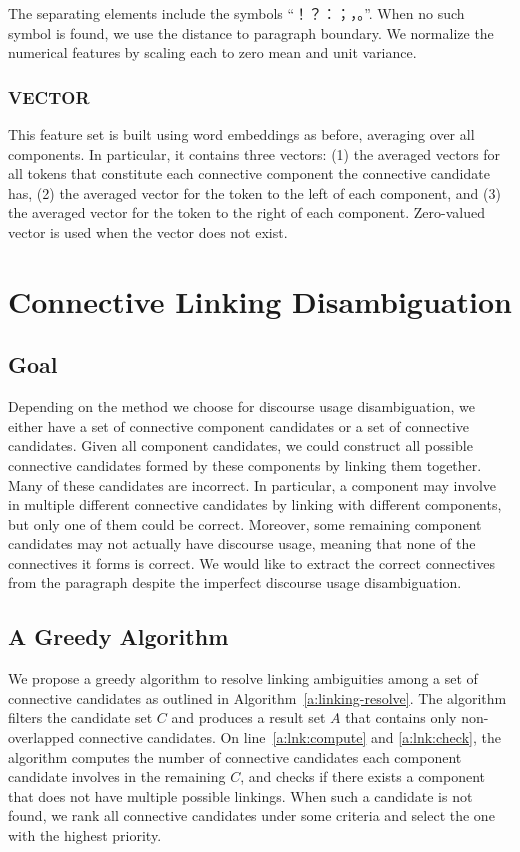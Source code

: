 The separating elements include the symbols ``！？：；，。''.
When no such symbol is found, we use the distance to paragraph boundary.
We normalize the numerical features by scaling each to zero mean and unit variance.

\subsubsection{VECTOR}

This feature set is built using word embeddings as before, averaging over all components.
In particular, it contains three vectors: (1) the averaged vectors
for all tokens that constitute each connective component the connective candidate has,
(2) the averaged vector for the
token to the left of each component, and (3) the averaged vector for the token to the
right of each component. Zero-valued vector is used when the vector does not exist.

\section{Connective Linking Disambiguation}
\label{s:linking-disambig}

\subsection{Goal}

Depending on the method we choose for discourse usage disambiguation, we
either have a set of connective component candidates or a set of connective
candidates. Given all component candidates, we could construct all possible
connective candidates formed by these components by linking them together.
Many of these candidates are incorrect. In particular, a component may involve in
multiple different connective candidates by linking with different components,
but only one of them could be correct. Moreover, some remaining component
candidates may not actually have discourse usage, meaning that none of
the connectives it forms is correct. We would like to extract the
correct connectives from the paragraph despite the imperfect discourse usage
disambiguation.

\subsection{A Greedy Algorithm}

We propose a greedy algorithm to resolve linking ambiguities among a set of
connective candidates as outlined in Algorithm~\ref{a:linking-resolve}.
The algorithm filters the candidate set $C$ and produces a result set $A$ that
contains only non-overlapped connective candidates. On line~\ref{a:lnk:compute}
and \ref{a:lnk:check}, the algorithm computes the number of connective candidates
each component candidate involves in the remaining $C$, and checks if there exists
a component that does not have multiple possible linkings. When such a candidate
is not found, we rank all connective candidates under some criteria
and select the one with the highest priority.

